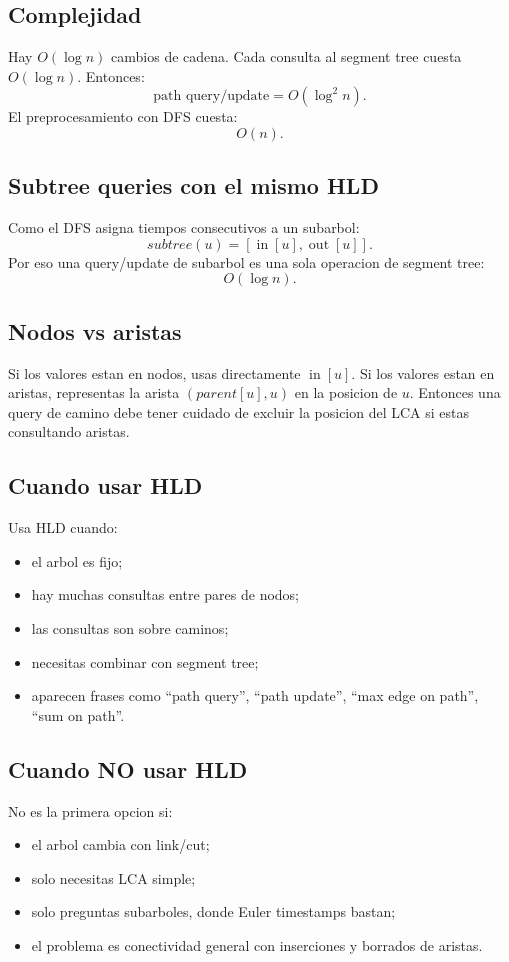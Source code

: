 \documentclass[10pt]{article}
\newcommand{\bigO}{O}
\newcommand{\tin}{\operatorname{in}}
\newcommand{\tout}{\operatorname{out}}
\begin{document}
\subsection{Complejidad}
Hay $\bigO(\log n)$ cambios de cadena. Cada consulta al segment tree cuesta
$\bigO(\log n)$. Entonces:
\[
\text{path query/update}=\bigO(\log^2 n).
\]
El preprocesamiento con DFS cuesta:
\[
\bigO(n).
\]

\subsection{Subtree queries con el mismo HLD}
Como el DFS asigna tiempos consecutivos a un subarbol:
\[
subtree(u)=[\tin[u],\tout[u]].
\]
Por eso una query/update de subarbol es una sola operacion de segment tree:
\[
\bigO(\log n).
\]

\subsection{Nodos vs aristas}
Si los valores estan en nodos, usas directamente $\tin[u]$. Si los valores
estan en aristas, representas la arista $(parent[u],u)$ en la posicion de $u$.
Entonces una query de camino debe tener cuidado de excluir la posicion del LCA
si estas consultando aristas.

\subsection{Cuando usar HLD}
Usa HLD cuando:
\begin{itemize}[leftmargin=*]
\item el arbol es fijo;
\item hay muchas consultas entre pares de nodos;
\item las consultas son sobre caminos;
\item necesitas combinar con segment tree;
\item aparecen frases como ``path query'', ``path update'', ``max edge on path'',
``sum on path''.
\end{itemize}

\subsection{Cuando NO usar HLD}
No es la primera opcion si:
\begin{itemize}[leftmargin=*]
\item el arbol cambia con link/cut;
\item solo necesitas LCA simple;
\item solo preguntas subarboles, donde Euler timestamps bastan;
\item el problema es conectividad general con inserciones y borrados de aristas.
\end{itemize}
\end{document}
